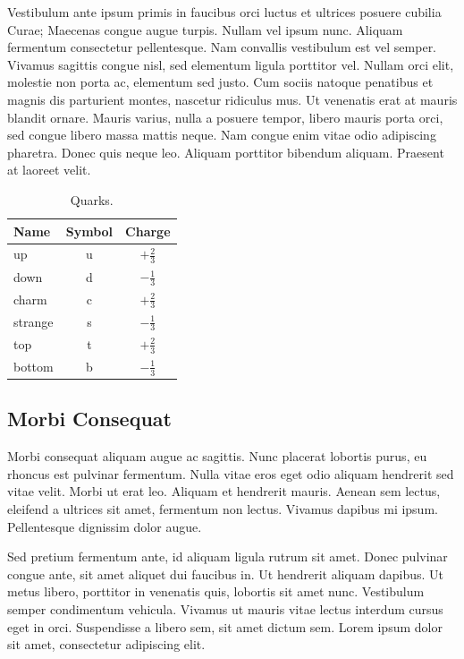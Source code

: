 Vestibulum ante ipsum primis in faucibus orci luctus et ultrices posuere cubilia Curae; Maecenas congue augue turpis. Nullam vel ipsum nunc. Aliquam fermentum consectetur pellentesque. Nam convallis vestibulum est vel semper. Vivamus sagittis congue nisl, sed elementum ligula porttitor vel. Nullam orci elit, molestie non porta ac, elementum sed justo. Cum sociis natoque penatibus et magnis dis parturient montes, nascetur ridiculus mus. Ut venenatis erat at mauris blandit ornare. Mauris varius, nulla a posuere tempor, libero mauris porta orci, sed congue libero massa mattis neque. Nam congue enim vitae odio adipiscing pharetra. Donec quis neque leo. Aliquam porttitor bibendum aliquam. Praesent at laoreet velit. 


\begin{table}
\caption{Quarks.}
\begin{center}
\begin{tabular}{l|c|c}
\hline
\hline
Name & Symbol & Charge \\
\hline
up & u & $+\frac{2}{3}$ \\
down & d & $-\frac{1}{3}$ \\
charm & c & $+\frac{2}{3}$ \\
strange & s & $-\frac{1}{3}$ \\
top & t & $+\frac{2}{3}$ \\
bottom & b & $-\frac{1}{3}$ \\
\hline
\hline
\end{tabular}
\end{center}
\end{table}

\subsection{Morbi Consequat}

Morbi consequat aliquam augue ac sagittis. Nunc placerat lobortis purus, eu rhoncus est pulvinar fermentum. Nulla vitae eros eget odio aliquam hendrerit sed vitae velit. Morbi ut erat leo. Aliquam et hendrerit mauris. Aenean sem lectus, eleifend a ultrices sit amet, fermentum non lectus. Vivamus dapibus mi ipsum. Pellentesque dignissim dolor augue. 

Sed pretium fermentum ante, id aliquam ligula rutrum sit amet. Donec pulvinar congue ante, sit amet aliquet dui faucibus in. Ut hendrerit aliquam dapibus. Ut metus libero, porttitor in venenatis quis, lobortis sit amet nunc. Vestibulum semper condimentum vehicula. Vivamus ut mauris vitae lectus interdum cursus eget in orci. Suspendisse a libero sem, sit amet dictum sem. Lorem ipsum dolor sit amet, consectetur adipiscing elit. 







